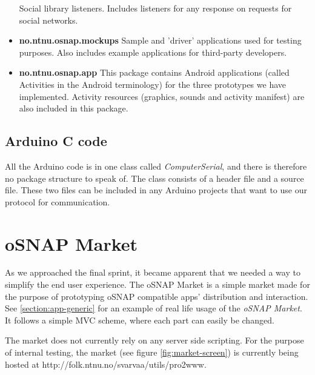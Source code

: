 \begin{itemize}
		Social library listeners. Includes listeners for any response on requests for social networks.
	\item \textbf{no.ntnu.osnap.mockups}\newline\label{section:mockup}
		Sample and 'driver' applications used for testing purposes.
		Also includes example applications for third-party developers.
	\item \textbf{no.ntnu.osnap.app}\newline
		This package contains Android applications (called Activities in the Android terminology) for the three prototypes
		we have implemented. Activity resources (graphics, sounds and activity manifest) are also included in this package.
\end{itemize}

\subsection{Arduino C code}
All the Arduino code is in one class called \emph{ComputerSerial}, and there is therefore no package structure to speak of.
The class consists of a header file and a source file. These two files can be included in any Arduino projects that want to use our protocol for communication.

\section{oSNAP Market}
As we approached the final sprint, it became apparent that we needed a way to simplify the end user experience. The oSNAP Market is a simple market made for the purpose of prototyping oSNAP compatible apps' distribution and interaction.  See \ref{section:app-generic} for an example of real life usage of the \emph{oSNAP Market}. It follows a simple MVC scheme, where each part can easily be changed.

The market does not currently rely on any server side scripting. For the purpose of internal testing, the market (see figure \ref{fig:market-screen}) is currently being hosted at \newline http://folk.ntnu.no/svarvaa/utils/pro2www.

